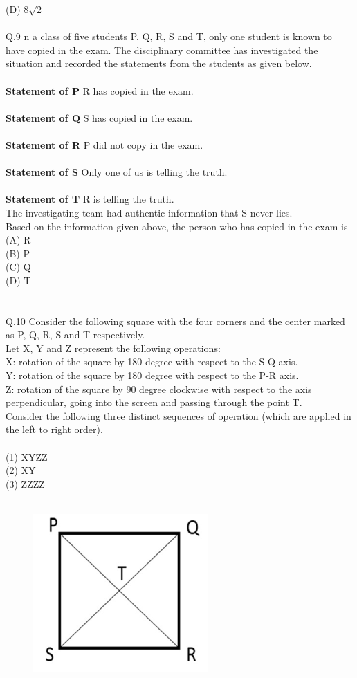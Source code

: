 \documentclass{book}[200pt]
\begin{document}
{	   (D) $8\sqrt{2}$\\
	   \\
	   Q.9 n a class of five students P, Q, R, S and T, only one student is known to have
	   copied in the exam. The disciplinary committee has investigated the situation
	   and recorded the statements from the students as given below.\\
	   \\
	   \textbf{Statement of P} R has copied in the exam. \\
	   \\
	   \textbf{Statement of Q} S has copied in the exam. \\
	   \\
	   \textbf{Statement of R} P did not copy in the exam. \\
	   \\
	   \textbf{Statement of S} Only one of us is telling the truth.\\
	   \\
	   \textbf{Statement of T} R is telling the truth. \\
	   The investigating team had authentic information that S never lies.\\
	   Based on the information given above, the person who has copied in the exam is\\
	   (A) R\\
	   (B) P\\
	   (C) Q\\
	   (D) T\\
	   \\
	   \\
	   Q.10 Consider the following square with the four corners and the
	   center marked as P, Q, R, S and T respectively.\\
	   Let X, Y and Z represent the following operations: \\
	   X: rotation of the square by 180 degree with respect to the
	   S-Q axis.\\
	   Y: rotation of the square by 180 degree with respect to the P-R axis.\\
	   Z: rotation of the square by 90 degree clockwise with respect to the axis
	   perpendicular, going into the screen and passing through the point T.\\
	   Consider the following three distinct sequences of operation (which are applied
	   in the left to right order).\\
	   \\
	   (1) XYZZ\\
	   (2) XY\\
	   (3) ZZZZ\\
	   \\
\begin{figure}[H]
	\centering
	\includegraphics[width=0.2\linewidth]{screenshot003}
	\caption{}
	\label{fig:screenshot003}
\end{figure}

}
\end{document}
